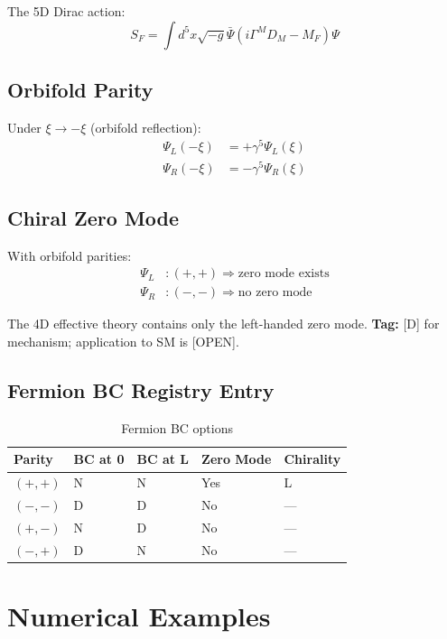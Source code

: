 \documentclass[11pt,a4paper]{article}
\begin{document}
The 5D Dirac action:
\begin{equation}
  S_F = \int d^5x \sqrt{-g} \bar{\Psi} (i\Gamma^M D_M - M_F) \Psi
  \label{eq:fermion-action}
\end{equation}

\subsection{Orbifold Parity}

Under $\xi \to -\xi$ (orbifold reflection):
\begin{align}
  \Psi_L(-\xi) &= +\gamma^5 \Psi_L(\xi)
  \label{eq:orbifold-L} \\
  \Psi_R(-\xi) &= -\gamma^5 \Psi_R(\xi)
  \label{eq:orbifold-R}
\end{align}

\subsection{Chiral Zero Mode}

With orbifold parities:
\begin{align}
  \Psi_L &: (+, +) \Rightarrow \text{zero mode exists}
  \label{eq:chiral-L} \\
  \Psi_R &: (-, -) \Rightarrow \text{no zero mode}
  \label{eq:chiral-R}
\end{align}

The 4D effective theory contains only the left-handed zero mode.
\textbf{Tag:} [D] for mechanism; application to SM is [OPEN].

\subsection{Fermion BC Registry Entry}

\begin{table}[h]
\centering
\caption{Fermion BC options}
\label{tab:fermion-bc}
\begin{tabular}{lllll}
\toprule
Parity & BC at 0 & BC at L & Zero Mode & Chirality \\
\midrule
$(+,+)$ & N & N & Yes & L \\
$(-,-)$ & D & D & No & — \\
$(+,-)$ & N & D & No & — \\
$(-,+)$ & D & N & No & — \\
\bottomrule
\end{tabular}
\end{table}

\section{Numerical Examples}
\label{app:numerical}
\end{document}

